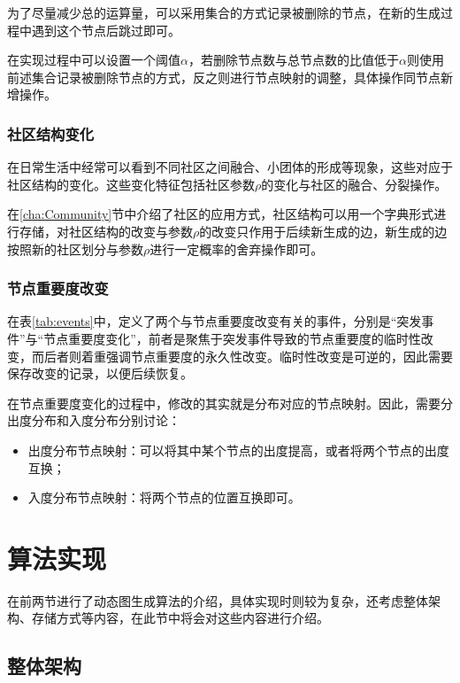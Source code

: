 为了尽量减少总的运算量，可以采用集合的方式记录被删除的节点，在新的生成过程中遇到这个节点后跳过即可。

在实现过程中可以设置一个阈值$\alpha$，若删除节点数与总节点数的比值低于$\alpha$则使用前述集合记录被删除节点的方式，反之则进行节点映射的调整，具体操作同节点新增操作。

\subsubsection{社区结构变化}

在日常生活中经常可以看到不同社区之间融合、小团体的形成等现象，这些对应于社区结构的变化。这些变化特征包括社区参数$\rho$的变化与社区的融合、分裂操作。

在\ref{cha:Community}节中介绍了社区的应用方式，社区结构可以用一个字典形式进行存储，对社区结构的改变与参数$\rho$的改变只作用于后续新生成的边，新生成的边按照新的社区划分与参数$\rho$进行一定概率的舍弃操作即可。

\subsubsection{节点重要度改变}

在表\ref{tab:events}中，定义了两个与节点重要度改变有关的事件，分别是“突发事件”与“节点重要度变化”，前者是聚焦于突发事件导致的节点重要度的临时性改变，而后者则着重强调节点重要度的永久性改变。临时性改变是可逆的，因此需要保存改变的记录，以便后续恢复。

在节点重要度变化的过程中，修改的其实就是分布对应的节点映射。因此，需要分出度分布和入度分布分别讨论：

\begin{itemize}
  \item 出度分布节点映射：可以将其中某个节点的出度提高，或者将两个节点的出度互换；
  \item 入度分布节点映射：将两个节点的位置互换即可。
\end{itemize}

\vspace{0.2cm}

\section{算法实现}
\label{cha:tool_implementation}

在前两节进行了动态图生成算法的介绍，具体实现时则较为复杂，还考虑整体架构、存储方式等内容，在此节中将会对这些内容进行介绍。

\subsection{整体架构}

